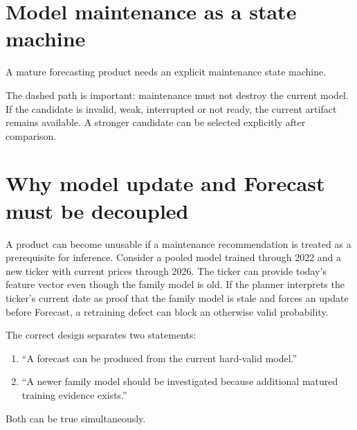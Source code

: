 \documentclass[11pt]{article}
\begin{document}
\section{Model maintenance as a state machine}
A mature forecasting product needs an explicit maintenance state machine.
\begin{center}
\end{center}

The dashed path is important: maintenance must not destroy the current model. If the candidate is invalid, weak, interrupted or not ready, the current artifact remains available. A stronger candidate can be selected explicitly after comparison.

\section{Why model update and Forecast must be decoupled}
A product can become unusable if a maintenance recommendation is treated as a prerequisite for inference. Consider a pooled model trained through 2022 and a new ticker with current prices through 2026. The ticker can provide today's feature vector even though the family model is old. If the planner interprets the ticker's current date as proof that the family model is stale and forces an update before Forecast, a retraining defect can block an otherwise valid probability.

The correct design separates two statements:
\begin{enumerate}[itemsep=0.2em]
\item ``A forecast can be produced from the current hard-valid model.''
\item ``A newer family model should be investigated because additional matured training evidence exists.''
\end{enumerate}
Both can be true simultaneously.
\end{document}
